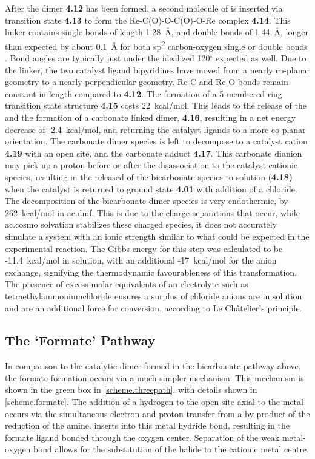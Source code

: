 After the dimer \textbf{4.12} has been formed, a second molecule of  is inserted via transition state \textbf{4.13} to form the Re-C(O)-O-C(O)-O-Re complex \textbf{4.14}. This  linker contains  single bonds of length 1.28~\r{A}, and  double bonds of 1.44~\r{A}, longer than expected by about 0.1~\r{A} for both sp\textsuperscript{2} carbon-oxygen single or double bonds \autocite{crc1998}. Bond angles are typically just under the idealized 120$^\circ$ expected as well. Due to the linker, the two catalyst ligand bipyridines have moved from a nearly co-planar geometry to a nearly perpendicular geometry. Re-C and Re-O bonds remain constant in length compared to \textbf{4.12}. The formation of a 5 membered ring transition state structure \textbf{4.15} costs 22~kcal/mol. This leads to the release of the  and the formation of a carbonate linked dimer, \textbf{4.16}, resulting in a net energy decrease of -2.4~kcal/mol, and returning the catalyst ligands to a more co-planar orientation. The carbonate dimer species is left to decompose to a catalyst cation \textbf{4.19} with an open site, and the carbonate adduct \textbf{4.17}. This carbonate dianion may pick up a proton before or after the disassociation to the catalyst cationic species, resulting in the released of the bicarbonate species to solution (\textbf{4.18)} when the catalyst is returned to ground state \textbf{4.01} with addition of a chloride. The decomposition of the bicarbonate dimer species is very endothermic, by 262~kcal/mol in \gls{ac.dmf}. This is due to the charge separations that occur, while \gls{ac.cosmo} solvation stabilizes these charged species, it does not accurately simulate a system with an ionic strength similar to what could be expected in the experimental reaction. The Gibbs energy for this step was calculated to be -11.4~kcal/mol in solution, with an additional -17~kcal/mol for the anion exchange, signifying the thermodynamic favourableness of this transformation. The presence of excess molar equivalents of an electrolyte such as tetraethylammoniumchloride ensures a surplus of chloride anions are in solution and are an additional force for conversion, according to Le Ch\^{a}telier's principle.

\subsection{The `Formate' Pathway}\label{ss.formate}
In comparison to the catalytic dimer formed in the bicarbonate pathway above, the formate formation occurs via a much simpler mechanism. This mechanism is shown in the green box in \autoref{scheme.threepath}, with details shown in \autoref{scheme.formate}. The addition of a hydrogen to the open site axial to the metal occurs via the simultaneous electron and proton transfer from a by-product of the reduction of the amine.  inserts into this metal hydride bond, resulting in the formate ligand bonded through the oxygen center\autocite{sullivan1984, sullivan1986, creutz2007}. Separation of the weak metal-oxygen bond allows for the substitution of the halide to the cationic metal centre. 

